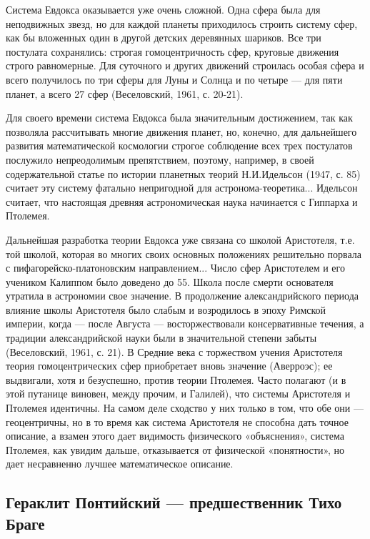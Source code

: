 Система Евдокса оказывается уже очень сложной. Одна сфера была для
неподвижных звезд, но для каждой планеты приходилось строить систему
сфер, как бы вложенных один в другой детских деревянных шариков. Все
три постулата сохранялись: строгая гомоцентричность сфер, круговые
движения строго равномерные. Для суточного и других движений строилась
особая сфера и всего получилось по три сферы для Луны и Солнца и по
четыре --- для пяти планет, а всего 27 сфер (Веселовский, 1961, с.
20-21).

Для своего времени система Евдокса была значительным достижением, так
как позволяла рассчитывать многие движения планет, но, конечно, для
дальнейшего развития математической космологии строгое соблюдение всех
трех постулатов послужило непреодолимым препятствием, поэтому,
например, в своей содержательной статье по истории планетных теорий
Н.И.Идельсон (1947, с. 85) считает эту систему фатально непригодной
для астронома-теоретика... Идельсон считает, что настоящая древняя
астрономическая наука начинается с Гиппарха и Птолемея.

Дальнейшая разработка теории Евдокса уже связана со школой Аристотеля,
т.е. той школой, которая во многих своих основных положениях
решительно порвала с пифагорейско-платоновским направлением... Число
сфер Аристотелем и его учеником Калиппом было доведено до 55. Школа
после смерти основателя утратила в астрономии свое значение. В
продолжение александрийского периода влияние школы Аристотеля было
слабым и возродилось в эпоху Римской империи, когда --- после Августа
--- восторжествовали консервативные течения, а традиции
александрийской науки были в значительной степени забыты (Веселовский,
1961, с. 21). В Средние века с торжеством учения Аристотеля теория
гомоцентрических сфер приобретает вновь значение (Аверроэс); ее
выдвигали, хотя и безуспешно, против теории Птолемея. Часто полагают
(и в этой путанице виновен, между прочим, и Галилей), что системы
Аристотеля и Птолемея идентичны. На самом деле сходство у них только в
том, что обе они --- геоцентричны, но в то время как система
Аристотеля не способна дать точное описание, а взамен этого дает
видимость физического «объяснения», система Птолемея, как увидим
дальше, отказывается от физической «понятности», но дает несравненно
лучшее математическое описание.

\subsection{Гераклит Понтийский --- предшественник Тихо Браге}

